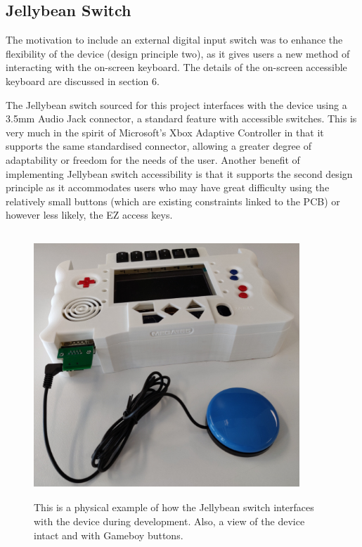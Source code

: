 \subsection{Jellybean Switch} \label{Jellybean Switch}

The motivation to include an external digital input switch was to enhance the flexibility of the device (design principle two), as it gives users a new method of interacting with the on-screen keyboard.
The details of the on-screen accessible keyboard are discussed in section 6.

The Jellybean switch sourced for this project interfaces with the device using a 3.5mm Audio Jack connector, a standard feature with accessible switches.
This is very much in the spirit of Microsoft's Xbox Adaptive Controller\cite{adaptive} in that it supports the same standardised connector, allowing a greater degree of adaptability or freedom for the needs of the user.
Another benefit of implementing Jellybean switch accessibility is that it supports the second design principle as it accommodates users who may have great difficulty using the relatively small buttons (which are existing constraints linked to the PCB) or however less likely, the EZ access keys.

\begin{figure} [h]
    \centering
    \includegraphics[width=10cm,height=10cm,keepaspectratio]{Figures/jellybean.png}
    \caption{This is a physical example of how the Jellybean switch interfaces with the device during development. Also, a view of the device intact and with Gameboy buttons.}
    \label{fig:Jellybean}
\end{figure}

